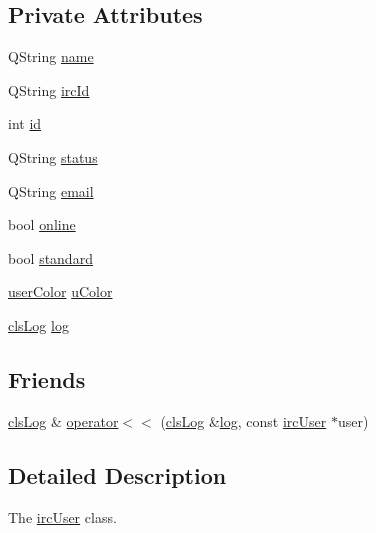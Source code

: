 \subsection*{Private Attributes}
\begin{DoxyCompactItemize}
\item 
Q\-String \hyperlink{classserver_1_1irc_user_a741feff79ca2d07554a7fbf879efff63}{name}
\item 
Q\-String \hyperlink{classserver_1_1irc_user_a0380d5ace6770dbdc30187d348d837ed}{irc\-Id}
\item 
int \hyperlink{classserver_1_1irc_user_af55b2056fb7f59055417bda5d3187b4e}{id}
\item 
Q\-String \hyperlink{classserver_1_1irc_user_acf198f11436cfa83a42048850d276c95}{status}
\item 
Q\-String \hyperlink{classserver_1_1irc_user_aeadaf50889cd947cb5080cb9fe0707bd}{email}
\item 
bool \hyperlink{classserver_1_1irc_user_a4874a205aff9f60882022a94f73e125d}{online}
\item 
bool \hyperlink{classserver_1_1irc_user_ac91172ae6a09106ed851634d1e7c6553}{standard}
\item 
\hyperlink{structserver_1_1irc_user_1_1user_color}{user\-Color} \hyperlink{classserver_1_1irc_user_a84807f272b7a5b30396f0b726c25202e}{u\-Color}
\item 
\hyperlink{class_k4_u_1_1cls_log}{cls\-Log} \hyperlink{classserver_1_1irc_user_a253b46e0b18048beeb0828b1a4909ef5}{log}
\end{DoxyCompactItemize}
\subsection*{Friends}
\begin{DoxyCompactItemize}
\item 
\hyperlink{class_k4_u_1_1cls_log}{cls\-Log} \& \hyperlink{classserver_1_1irc_user_a83b156fde9fc386542b06c6b5aa170e7}{operator$<$$<$} (\hyperlink{class_k4_u_1_1cls_log}{cls\-Log} \&\hyperlink{classserver_1_1irc_user_a253b46e0b18048beeb0828b1a4909ef5}{log}, const \hyperlink{classserver_1_1irc_user}{irc\-User} $\ast$user)
\end{DoxyCompactItemize}


\subsection{Detailed Description}
The \hyperlink{classserver_1_1irc_user}{irc\-User} class. 

